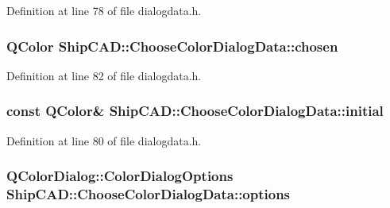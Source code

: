 Definition at line 78 of file dialogdata.\+h.

\subsubsection[{\texorpdfstring{chosen}{chosen}}]{\setlength{\rightskip}{0pt plus 5cm}Q\+Color Ship\+C\+A\+D\+::\+Choose\+Color\+Dialog\+Data\+::chosen}\hypertarget{structShipCAD_1_1ChooseColorDialogData_afa2fd53ceaab239e68818cb93463e247}{}\label{structShipCAD_1_1ChooseColorDialogData_afa2fd53ceaab239e68818cb93463e247}


Definition at line 82 of file dialogdata.\+h.

\subsubsection[{\texorpdfstring{initial}{initial}}]{\setlength{\rightskip}{0pt plus 5cm}const Q\+Color\& Ship\+C\+A\+D\+::\+Choose\+Color\+Dialog\+Data\+::initial}\hypertarget{structShipCAD_1_1ChooseColorDialogData_a63bc2080dc3d30fe9a448df004410c8b}{}\label{structShipCAD_1_1ChooseColorDialogData_a63bc2080dc3d30fe9a448df004410c8b}


Definition at line 80 of file dialogdata.\+h.

\subsubsection[{\texorpdfstring{options}{options}}]{\setlength{\rightskip}{0pt plus 5cm}Q\+Color\+Dialog\+::\+Color\+Dialog\+Options Ship\+C\+A\+D\+::\+Choose\+Color\+Dialog\+Data\+::options}\hypertarget{structShipCAD_1_1ChooseColorDialogData_ad0a90945a5a1942d892ca3a06dbd6545}{}\label{structShipCAD_1_1ChooseColorDialogData_ad0a90945a5a1942d892ca3a06dbd6545}


